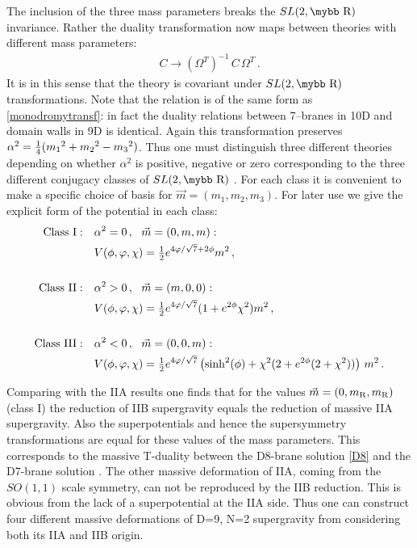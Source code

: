 \documentclass[12pt,a4paper]{article}
\def\bb#1{\hbox{\mybb#1}}
\begin{document}
The inclusion of the three mass parameters breaks the $SL(2,\bb{R})$
invariance. Rather the duality transformation now maps between
theories with different mass parameters:
\begin{align}
  C \rightarrow (\Omega^T)^{-1} \, C \, \Omega^T \,.
\end{align}
It is in this sense that the theory is covariant under $SL(2,\bb{R})$
transformations.
Note that the relation is of the same form as \eqref{monodromytransf}:
in fact the duality relations between 7--branes in 10D
and domain walls in 9D is identical. Again this transformation
preserves $\alpha^2 = {\textstyle {1\over 4}} (m_1{}^2+m_2{}^2-m_3{}^2)$.
Thus one must distinguish three different theories depending on
whether $\alpha^2$ is positive, negative or zero corresponding
to the three different conjugacy classes of $SL(2,\bb{R})$ \cite{Hull:1998vy}.
For each class it is convenient to make
a specific choice of basis for $\vec{m}=(m_1,m_2,m_3)$. For later use
we give the explicit form of the potential in each class:
\begin{equation}
\begin{aligned}
{\rm Class\ I}:\ \ \ &\alpha^2 = 0\, ,\ \   \vec{m}=(0,m,m): \\
  & V(\phi,\varphi,\chi) = \tfrac{1}{2} e^{4 \varphi / \sqrt{7} +
 2 \phi} m^2 \,, \\
&\\
{\rm Class\ II}:\ \ \ &\alpha^2 > 0\, ,\ \   \vec{m}=(m,0,0):\\
  & V(\phi,\varphi,\chi) = \tfrac{1}{2} e^{4 \varphi / \sqrt{7} }
    (1+e^{2 \phi} \chi^2) m^2 \,,
 \\
&\\
{\rm Class\ III}:\ \ \ &\alpha^2 < 0\, ,\ \   \vec{m}=(0,0,m):\\
  & V(\phi,\varphi,\chi) = \tfrac{1}{2} e^{4 \varphi / \sqrt{7}}
    \left (\sinh^2(\phi)+ \chi^2 (2+e^{2 \phi}(2+ \chi^2))\right) \, m^2 \,.
\end{aligned}
\label{3classes}
\end{equation}


Comparing with the IIA results one finds that for the values
$\vec{m}=(0,m_{\rm R},m_{\rm R})$ (class I) the reduction of IIB supergravity
equals the reduction of
massive IIA supergravity.
Also the superpotentials and hence the supersymmetry transformations
 are equal for these values of the mass parameters.
This corresponds to the massive T-duality between the
D8-brane solution \eqref{D8} and the D7-brane solution \cite{Bergshoeff:1996ui}.
The other massive deformation of IIA, coming from the $SO(1,1)$ scale
symmetry, can not be reproduced by the IIB reduction.
This is obvious from the lack of a superpotential at the IIA side.
Thus one can construct four different massive deformations of D=9,
N=2 supergravity from considering both its IIA and IIB origin.
\end{document}
